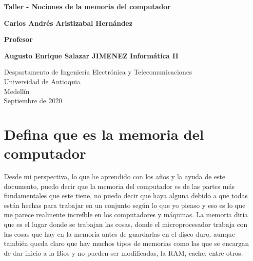 \documentclass{article}
\begin{document}
\begin{titlepage}
    \begin{center}
        \vspace*{1cm}
            
        \Huge
        \textbf{Taller - Nociones de la memoria del computador}
            
        \vspace{0.5cm}
        \LARGE
            
        \vspace{1.5cm}
            
        \textbf{Carlos Andrés Aristizabal Hernández}
        
        \vspace{0.8cm}
        \textbf{Profesor}
        
            \textbf{
Augusto Enrique Salazar JIMENEZ }
        \vfill
        \textbf{Informática II} 
        \vspace{0.8cm}
       
        \Large
        Despartamento de Ingeniería Electrónica y Telecomunicaciones\\
        Universidad de Antioquia\\
        Medellín\\
        Septiembre de 2020
            
    \end{center}
\end{titlepage}

\tableofcontents
\newpage
\section{Defina que es la memoria del computador}\label{intro}
Desde mi perspectiva, lo que he aprendido con los años y la ayuda de este documento, puedo decir que la memoria del computador es de las partes más fundamentales
que este tiene, no puedo decir que haya alguna debido a que todas están hechas para trabajar en un conjunto según lo que yo pienso y eso es lo que me parece realmente
increíble en los computadores y máquinas.
La memoria diría que es el lugar donde se trabajan las cosas, donde el microprocesador trabaja con las cosas que hay en la memoria antes de guardarlas en el disco duro.
aunque también queda claro que hay muchos tipos de memorias como las que se encargan de dar inicio a la Bios y no pueden ser modificadas, la RAM, cache, entre otros. \cite{Tame}
\end{document}
